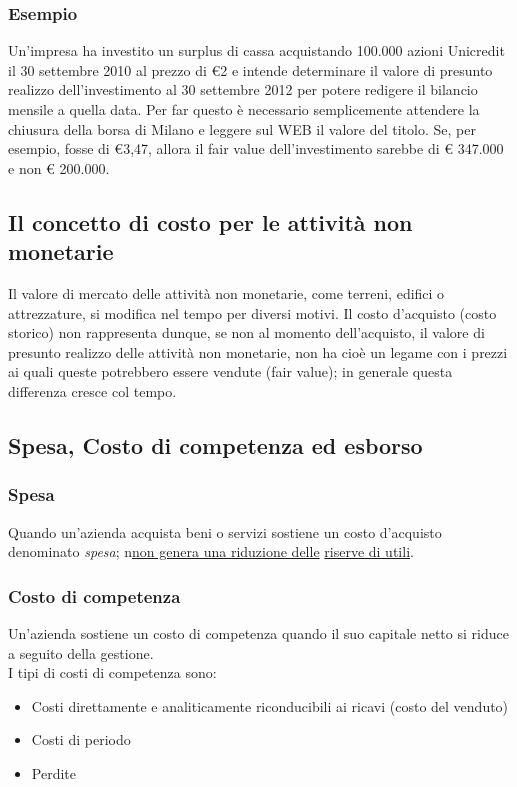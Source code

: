 \documentclass{article}
\begin{document}
\subsubsection*{Esempio}
Un'impresa ha investito un surplus di cassa acquistando 100.000 azioni
Unicredit il 30 settembre 2010 al prezzo di €2 e intende determinare il
valore di presunto realizzo dell'investimento al 30 settembre 2012 per
potere redigere il bilancio mensile a quella data. Per far questo è necessario semplicemente attendere la chiusura della
borsa di Milano e leggere sul WEB il valore del titolo. Se, per esempio,
fosse di €3,47, allora il fair value dell'investimento sarebbe di € 347.000 e
non € 200.000.



\subsection{Il concetto di costo per le attività non monetarie}
Il valore di mercato delle attività non monetarie, come terreni, edifici o attrezzature, si modifica nel tempo
per diversi motivi. Il costo d'acquisto (costo storico) non rappresenta dunque, se non al momento dell'acquisto, il valore di
presunto realizzo delle attività non monetarie, non ha cioè un legame con i prezzi ai quali queste
potrebbero essere vendute (fair value); in generale questa differenza cresce col tempo.



\subsection{Spesa, Costo di competenza ed esborso}
\subsubsection{Spesa}
Quando un'azienda acquista beni o servizi sostiene un costo d'acquisto denominato \textit{spesa}; n\underline{non genera una riduzione delle} \underline{riserve di utili}.


\subsubsection{Costo di competenza}
Un'azienda sostiene un costo di competenza quando il
suo capitale netto si riduce a seguito della gestione.
\vspace*{0.1cm}\\
I tipi di costi di competenza sono:
\begin{itemize}
    \item Costi direttamente e analiticamente riconducibili ai ricavi (costo del venduto)
    \item Costi di periodo
    \item Perdite
\end{itemize}
\end{document}
